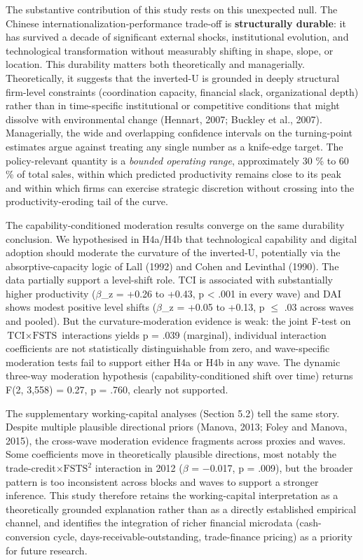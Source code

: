 \documentclass[12pt,a4paper]{article}
\begin{document}
The substantive contribution of this study rests on this unexpected
null. The Chinese internationalization-performance trade-off is
\textbf{structurally durable}: it has survived a decade of significant
external shocks, institutional evolution, and technological
transformation without measurably shifting in shape, slope, or location.
This durability matters both theoretically and managerially.
Theoretically, it suggests that the inverted-U is grounded in deeply
structural firm-level constraints (coordination capacity, financial
slack, organizational depth) rather than in time-specific institutional
or competitive conditions that might dissolve with environmental change
(Hennart, 2007; Buckley et al., 2007). Managerially, the wide and
overlapping confidence intervals on the turning-point estimates argue
against treating any single number as a knife-edge target. The
policy-relevant quantity is a \emph{bounded operating range},
approximately 30 \% to 60 \% of total sales, within which predicted
productivity remains close to its peak and within which firms can
exercise strategic discretion without crossing into the
productivity-eroding tail of the curve.

The capability-conditioned moderation results converge on the same
durability conclusion. We hypothesised in H4a/H4b that technological
capability and digital adoption should moderate the curvature of the
inverted-U, potentially via the absorptive-capacity logic of Lall (1992)
and Cohen and Levinthal (1990). The data partially support a level-shift
role. TCI is associated with substantially higher productivity
(\(\beta\)\_z = +0.26 to +0.43, p \textless{} .001 in every wave) and
DAI shows modest positive level shifts (\(\beta\)\_z = +0.05 to +0.13, p
\(\leq\) .03 across waves and pooled). But the curvature-moderation
evidence is weak: the joint F-test on \(\text{TCI} \times \text{FSTS}\)
interactions yields p = .039 (marginal), individual interaction
coefficients are not statistically distinguishable from zero, and
wave-specific moderation tests fail to support either H4a or H4b in any
wave. The dynamic three-way moderation hypothesis
(capability-conditioned shift over time) returns F(2, 3,558) = 0.27, p =
.760, clearly not supported.

The supplementary working-capital analyses (Section 5.2) tell the same
story. Despite multiple plausible directional priors (Manova, 2013;
Foley and Manova, 2015), the cross-wave moderation evidence fragments
across proxies and waves. Some coefficients move in theoretically
plausible directions, most notably the
trade-credit\(\times\)\(\mathrm{FSTS}^2\) interaction in 2012 (\(\beta\)
= −0.017, p = .009), but the broader pattern is too inconsistent across
blocks and waves to support a stronger inference. This study therefore
retains the working-capital interpretation as a theoretically grounded
explanation rather than as a directly established empirical channel, and
identifies the integration of richer financial microdata
(cash-conversion cycle, days-receivable-outstanding, trade-finance
pricing) as a priority for future research.
\end{document}

